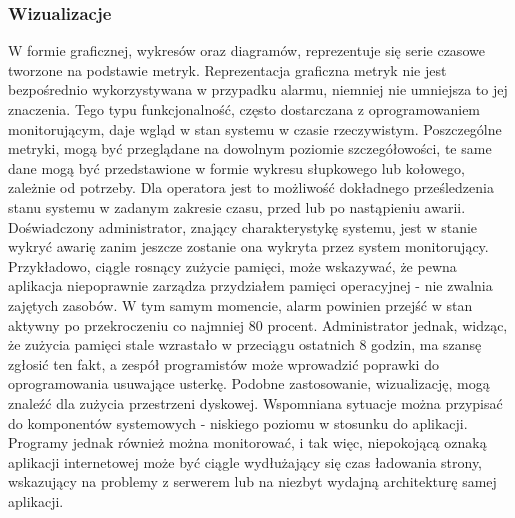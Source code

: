         \subsubsection{Wizualizacje}
        W formie graficznej, wykresów oraz diagramów, reprezentuje się serie czasowe tworzone na podstawie metryk. 
        Reprezentacja graficzna metryk nie jest bezpośrednio wykorzystywana w przypadku alarmu,
        niemniej nie umniejsza to jej znaczenia. Tego typu funkcjonalność, często dostarczana z oprogramowaniem
        monitorującym, daje wgląd w stan systemu w czasie rzeczywistym. Poszczególne metryki, mogą być
        przeglądane na dowolnym poziomie szczegółowości, te same dane mogą być przedstawione w formie
        wykresu słupkowego lub kołowego, zależnie od potrzeby. Dla operatora jest
        to możliwość dokładnego prześledzenia stanu systemu w zadanym zakresie czasu, przed lub po
        nastąpieniu awarii. Doświadczony administrator, znający charakterystykę systemu, jest w stanie
        wykryć awarię zanim jeszcze zostanie ona wykryta przez system monitorujący. Przykładowo, ciągle
        rosnący zużycie pamięci, może wskazywać, że pewna aplikacja niepoprawnie zarządza przydziałem
        pamięci operacyjnej - nie zwalnia zajętych zasobów. W tym samym momencie, alarm powinien przejść
        w stan aktywny po przekroczeniu co najmniej 80 procent. Administrator jednak, widząc, że zużycia pamięci
        stale wzrastało w przeciągu ostatnich 8 godzin, ma szansę zgłosić ten fakt, a zespół programistów
        może wprowadzić poprawki do oprogramowania usuwające usterkę. Podobne zastosowanie, wizualizację,
        mogą znaleźć dla zużycia przestrzeni dyskowej. Wspomniana sytuacje można przypisać do komponentów
        systemowych - niskiego poziomu w stosunku do aplikacji. Programy jednak również można monitorować,
        i tak więc, niepokojącą oznaką aplikacji internetowej może być ciągle wydłużający się czas 
        ładowania strony, wskazujący na problemy z serwerem lub na niezbyt wydajną architekturę samej aplikacji. 